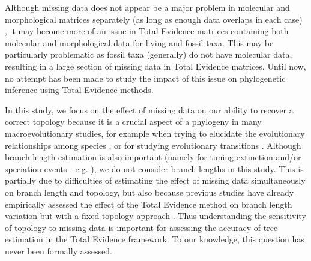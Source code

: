 \documentclass[12pt,letterpaper]{article}
\begin{document}
Although missing data does not appear be a major problem in molecular and morphological matrices separately (as long as enough data overlaps in each case) \citep{wiensmissing2003,wiensmissing2006,wiensmissing2008,rouresite-specific2011,pattinsonphylogeny2014}, it may become more of an issue in Total Evidence matrices containing both molecular and morphological data for living and fossil taxa. This may be particularly problematic as fossil taxa (generally) do not have molecular data, resulting in a large section of missing data in Total Evidence matrices. Until now, no attempt has been made to study the impact of this issue on phylogenetic inference using Total Evidence methods.

In this study, we focus on the effect of missing data on our ability to recover a correct topology because it is a crucial aspect of a phylogeny in many macroevolutionary studies, for example when trying to elucidate the evolutionary relationships among species \citep[e.g.][]{meredithimpacts2011,jetzthe2012}, or for studying evolutionary transitions \citep[e.g.][]{}. %
Although branch length estimation is also important (namely for timing extinction and/or speciation events - e.g. \citealt{ronquista2012}), we do not consider branch lengths in this study. This is partially due to difficulties of estimating the effect of missing data simultaneously on branch length and topology, %
but also because previous studies have already empirically assessed the effect of the Total Evidence method on branch length variation but with a fixed topology approach \citep{ronquista2012,schragocombining2013,slaterphylogenetic2013,beckancient2014}.
Thus understanding the sensitivity of topology to missing data is important for assessing the accuracy of tree estimation in the Total Evidence framework. To our knowledge, this question has never been formally assessed.
\end{document}
